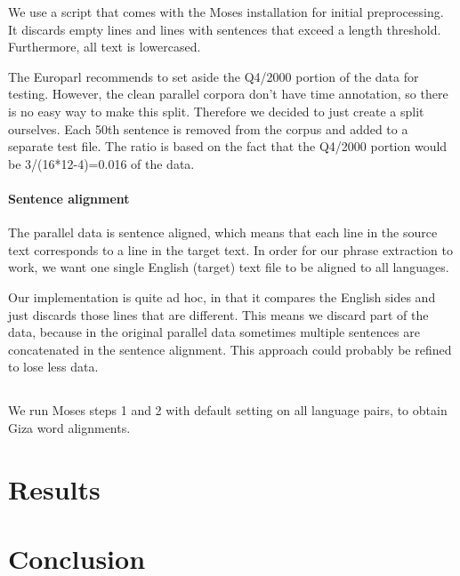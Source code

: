 \documentclass[11pt]{article}
\begin{document}
We use a script that comes with the Moses installation for initial preprocessing. It discards empty lines and lines with sentences that exceed a length threshold. Furthermore, all text is lowercased.

The Europarl recommends to set aside the Q4/2000 portion of the data for testing. However, the clean parallel corpora don't have time annotation, so there is no easy way to make this split. Therefore we decided to just create a split ourselves. Each 50th sentence is removed from the corpus and added to a separate test file. The ratio is based on the fact that the Q4/2000 portion would be 3/(16*12-4)=0.016 of the data.


\paragraph{Sentence alignment}
The parallel data is sentence aligned, which means that each line in the source text corresponds to a line in the target text.
In order for our phrase extraction to work, we want one single English (target) text file to be aligned to all languages.

Our implementation is quite ad hoc, in that it compares the English sides and just discards those lines that are different. This means we discard part of the data, because in the original parallel data sometimes multiple sentences are concatenated in the sentence alignment. This approach could probably be refined to lose less data. 


\subsection{}

We run Moses steps 1 and 2 with default setting on all language pairs, to obtain Giza word alignments. 


\section{Results}




\section{Conclusion}
\end{document}
